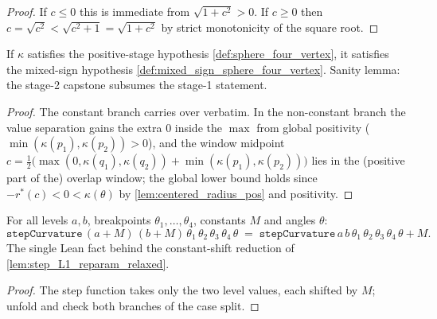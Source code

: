 \begin{proof}

\leanok
  If $c\le0$ this is immediate from $\sqrt{1+c^2}>0$. If $c\ge0$ then
  $c=\sqrt{c^2}<\sqrt{c^2+1}=\sqrt{1+c^2}$ by strict monotonicity of the
  square root.
\end{proof}

\begin{lemma}
  \label{lem:mixed_of_sphere_four_vertex}
  If $\kappa$ satisfies the positive-stage hypothesis
  \cref{def:sphere_four_vertex}, it satisfies the mixed-sign hypothesis
  \cref{def:mixed_sign_sphere_four_vertex}. Sanity lemma: the stage-2
  capstone subsumes the stage-1 statement.
\end{lemma}

\begin{proof}
  \leanok
  The constant branch carries over verbatim. In the non-constant branch the
  value separation gains the extra $0$ inside the $\max$ from global
  positivity ($\min(\kappa(p_1),\kappa(p_2))>0$), and the window midpoint
  $c=\tfrac12\bigl(\max(0,\kappa(q_1),\kappa(q_2))+\min(\kappa(p_1),
  \kappa(p_2))\bigr)$ lies in the (positive part of the) overlap window; the
  global lower bound holds since $-r^\ast(c)<0<\kappa(\theta)$ by
  \cref{lem:centered_radius_pos} and positivity.
\end{proof}

\begin{lemma}
  \label{lem:step_curvature_add_const}
  For all levels $a,b$, breakpoints $\theta_1,\dots,\theta_4$, constants $M$
  and angles $\theta$:
  \[
    \texttt{stepCurvature}\,(a+M)\,(b+M)\,\theta_1\,\theta_2\,\theta_3\,
    \theta_4\,\theta \;=\;
    \texttt{stepCurvature}\,a\,b\,\theta_1\,\theta_2\,\theta_3\,\theta_4\,
    \theta + M.
  \]
  The single Lean fact behind the constant-shift reduction of
  \cref{lem:step_L1_reparam_relaxed}.
\end{lemma}

\begin{proof}

\leanok
  The step function takes only the two level values, each shifted by $M$;
  unfold and check both branches of the case split.
\end{proof}

